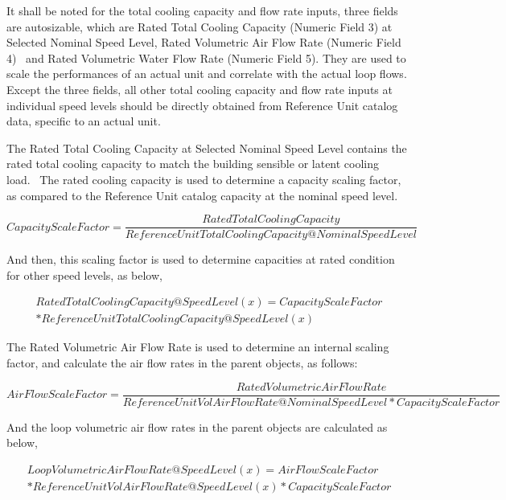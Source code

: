 It shall be noted for the total cooling capacity and flow rate inputs, three fields are autosizable, which are Rated Total Cooling Capacity (Numeric Field 3) at Selected Nominal Speed Level, Rated Volumetric Air Flow Rate (Numeric Field 4) ~and Rated Volumetric Water Flow Rate (Numeric Field 5). They are used to scale the performances of an actual unit and correlate with the actual loop flows. Except the three fields, all other total cooling capacity and flow rate inputs at individual speed levels should be directly obtained from Reference Unit catalog data, specific to an actual unit.

The Rated Total Cooling Capacity at Selected Nominal Speed Level contains the rated total cooling capacity to match the building sensible or latent cooling load.~ The rated cooling capacity is used to determine a capacity scaling factor, as compared to the Reference Unit catalog capacity at the nominal speed level.

\begin{equation}
CapacityScaleFactor = \frac{{RatedTotalCoolingCapacity}}{{ReferenceUnitTotalCoolingCapacity@NominalSpeedLevel}}
\end{equation}

And then, this scaling factor is used to determine capacities at rated condition for other speed levels, as below,

\begin{equation}
\begin{split}
  RatedTotalCoolingCapacity@SpeedLevel(x) = CapacityScaleFactor \\
  * ReferenceUnitTotalCoolingCapacity@SpeedLevel(x)
\end{split}
\end{equation}

The Rated Volumetric Air Flow Rate is used to determine an internal scaling factor, and calculate the air flow rates in the parent objects, as follows:

{\scriptsize
\begin{equation}
  AirFlowScaleFactor = \frac{RatedVolumetricAirFlowRate}{ReferenceUnitVolAirFlowRate@NominalSpeedLevel * CapacityScaleFactor}
\end{equation}}

And the loop volumetric air flow rates in the parent objects are calculated as below,

\begin{equation}
\begin{split}
  LoopVolumetricAirFlowRate@SpeedLevel\left( x \right) = AirFlowScaleFactor \\
  * ReferenceUnitVolAirFlowRate@SpeedLevel(x) * CapacityScaleFactor
\end{split}
\end{equation}

